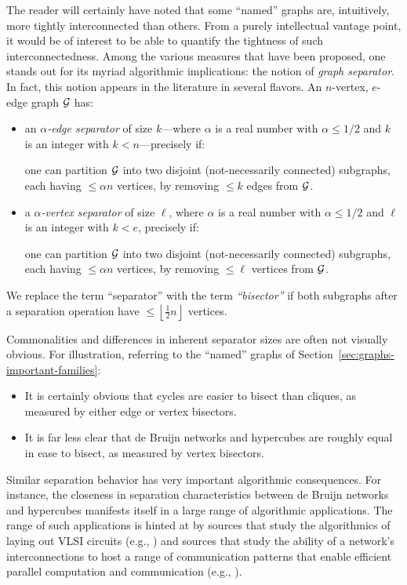 The reader will certainly have noted that some ``named'' graphs are, intuitively, more  tightly interconnected than others.  From a purely intellectual vantage point, it would  be of interest to be able to quantify the tightness of such interconnectedness.  Among  the various measures that have been proposed, one stands out for its myriad algorithmic implications: the notion of {\it graph separator}.  In fact, this notion appears in the literature in several flavors.  An $n$-vertex, $e$-edge graph $\mbox{$\cal G$}$ has:
\begin{itemize}
\item
an {\it $\alpha$-edge separator} of size $k$---where $\alpha$ is a real number with $\alpha \leq 1/2$  and $k$ is an integer with $k < n$---precisely if:

\smallskip

one can partition $\mbox{$\cal G$}$ into two disjoint (not-necessarily connected) subgraphs, each having 
$\leq \alpha n$ vertices, by removing $\leq k$ edges from $\mbox{$\cal G$}$.

\item
a {\it $\alpha$-vertex separator} of size $\ell$, where $\alpha$ is a real number with  $\alpha \leq 1/2$ and $\ell$ is an integer with $k < e$, precisely if:

\smallskip

one can partition $\mbox{$\cal G$}$ into two disjoint (not-necessarily connected) subgraphs, each having
$\leq \alpha n$ vertices, by removing $\leq \ell$ vertices from $\mbox{$\cal G$}$.
\end{itemize}
We replace the term ``separator'' with the term {\em ``bisector''}  if both subgraphs after a 
separation operation have $\leq \left\lfloor \frac{1}{2} n \right\rfloor$ vertices.
 

\medskip

Commonalities and differences in inherent separator sizes are often not visually obvious.  For illustration, referring to the ``named'' graphs of Section~\ref{sec:graphs-important-families}:
\begin{itemize}
\item
It is certainly obvious that cycles are easier to bisect than cliques, as measured by either edge or vertex bisectors.
\item
It is far less clear that de Bruijn networks and hypercubes are roughly equal in ease to bisect, as measured by vertex bisectors.
\end{itemize}
Similar separation behavior has very important algorithmic consequences.  For instance, the closeness in separation characteristics between de Bruijn networks and hypercubes manifests itself in a large range of algorithmic applications.  The range of such applications is hinted at by sources that study the algorithmics of laying out VLSI circuits (e.g., \cite{Leiserson85}) and sources that study the ability of a network's interconnections to host a range of communication patterns that enable efficient parallel computation and communication (e.g., \cite{AnnexsteinBR90,Leiserson85,Ullman84}).

